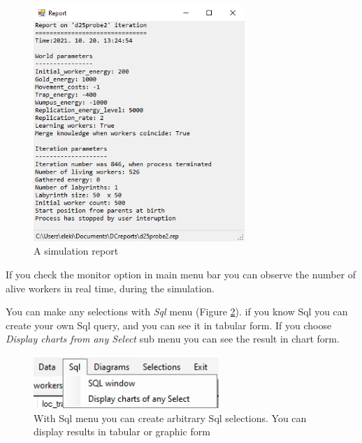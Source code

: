 \documentclass[a4paper,12pt]{article}
\begin{document}
\begin{figure}
	\begin{center}
		\includegraphics[width=8cm]{simreport}
		\caption{A simulation report }
		\label{fig:simreport}
	\end{center}
\end{figure}


If you check the monitor option  in main menu bar you can observe the number of alive workers in real time, during the simulation.





You can make any selections with \textit{Sql} menu (Figure \ref{fig:mnusql}). if you know Sql you can create your own Sql query, and you can see it in tabular form. If you choose \textit{Display charts from any Select} sub menu you can see the result in chart form.

\begin{figure}
	\begin{center}
		\includegraphics[width=7cm]{mnusql.png}
		\caption{With Sql menu you can create arbitrary Sql selections. You can display results in tabular or graphic form}
		\label{fig:mnusql}
	\end{center}
	\end{figure}
\end{document}
